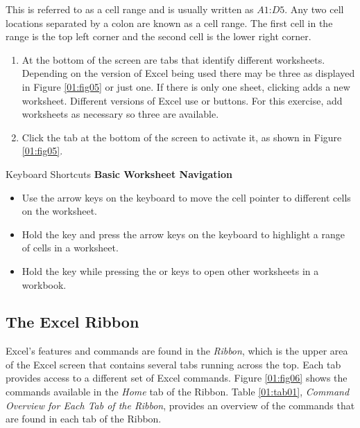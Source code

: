 This is referred to as a cell range and is usually written as $ A1 $:$ D5 $. Any two cell locations separated by a colon are known as a cell range. The first cell in the range is the top left corner and the second cell is the lower right corner.

\begin{enumerate}
	\item At the bottom of the screen are tabs that identify different worksheets. Depending on the version of Excel being used there may be three as displayed in Figure \ref{01:fig05} or just one. If there is only one sheet, clicking  adds a new worksheet. Different versions of Excel use \fmtButton{$ + $} or  buttons. For this exercise, add worksheets as necessary so three are available.
	\item Click the  tab at the bottom of the screen to activate it, as shown in Figure \ref{01:fig05}.
\end{enumerate}

\begin{center}
	\begin{shtcutbox}{Keyboard Shortcuts}
		\textbf{Basic Worksheet Navigation}
		\\
		\begin{itemize}
			\setlength{\itemsep}{0pt}
			\setlength{\parskip}{0pt}
			\setlength{\parsep}{0pt}

			\item Use the arrow keys on the keyboard to move the cell pointer to different cells on the worksheet.
			\item Hold the  key and press the arrow keys on the keyboard to highlight a range of cells in a worksheet.
			\item Hold the  key while pressing the  or  keys to open other worksheets in a workbook.

		\end{itemize}
	\end{shtcutbox}
\end{center}

\subsection{The Excel Ribbon}

Excel's features and commands are found in the \textit{Ribbon}, which is the upper area of the Excel screen that contains several tabs running across the top. Each tab provides access to a different set of Excel commands. Figure \ref{01:fig06} shows the commands available in the \textit{Home} tab of the Ribbon. Table \ref{01:tab01}, \textit{Command Overview for Each Tab of the Ribbon}, provides an overview of the commands that are found in each tab of the Ribbon.

